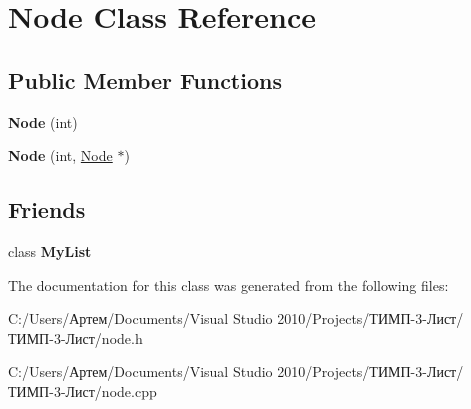 \hypertarget{class_node}{}\section{Node Class Reference}
\label{class_node}
\subsection*{Public Member Functions}
\begin{DoxyCompactItemize}
\item 
\hypertarget{class_node_aff71d952af8363f046a67a8b12194e46}{}{\bfseries Node} (int)\label{class_node_aff71d952af8363f046a67a8b12194e46}

\item 
\hypertarget{class_node_aff31c12e14a6f00952a46ff967db0c96}{}{\bfseries Node} (int, \hyperlink{class_node}{Node} $\ast$)\label{class_node_aff31c12e14a6f00952a46ff967db0c96}

\end{DoxyCompactItemize}
\subsection*{Friends}
\begin{DoxyCompactItemize}
\item 
\hypertarget{class_node_a3aca1c680e3cc534773a005bb24bfed4}{}class {\bfseries My\+List}\label{class_node_a3aca1c680e3cc534773a005bb24bfed4}

\end{DoxyCompactItemize}


The documentation for this class was generated from the following files\+:\begin{DoxyCompactItemize}
\item 
C\+:/\+Users/Артем/\+Documents/\+Visual Studio 2010/\+Projects/ТИМП-\/3-\/Лист/ТИМП-\/3-\/Лист/node.\+h\item 
C\+:/\+Users/Артем/\+Documents/\+Visual Studio 2010/\+Projects/ТИМП-\/3-\/Лист/ТИМП-\/3-\/Лист/node.\+cpp\end{DoxyCompactItemize}
